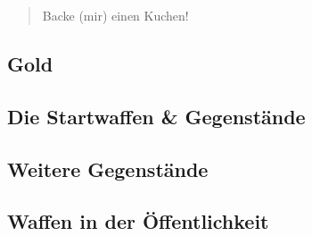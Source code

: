 \begin{quote}
    Backe (mir) einen Kuchen!
\end{quote}
\subsection{Gold}

\subsection{Die Startwaffen \& Gegenstände}

\subsection{Weitere Gegenstände}

\subsection{Waffen in der Öffentlichkeit}